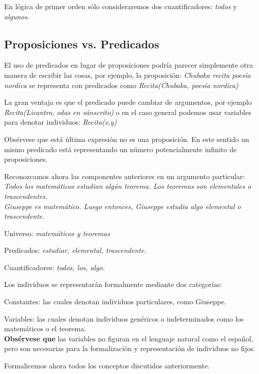 \documentclass[11pt,letterpaper]{article}
\begin{document}
En lógica de primer orden sólo consideraremos dos cuantificadores:
\emph{todos} y \emph{algunos}. 


\subsection{Proposiciones vs. Predicados}

El uso de predicados en lugar de proposiciones podría parecer simplemente
otra manera de escribir las cosas, por ejemplo, la proposición:
\bc
\textit{Chubaka recita poesía nordica}
\ec
se representa con predicados como
\bc
\textit{Recita(Chubaka, poesía nordica)}
\ec

\noindent La gran ventaja es que el predicado puede cambiar de argumentos, por 
ejemplo
\bc
\textit{Recita(Licantro, odas en sánscrito)} 
\ec
o en el caso general podemos usar variables para denotar individuos:
\bc
\textit{Recita(x,y)}
\ec


Obsérvese que está última expresión no es una proposición. 
En este sentido un mismo predicado está representando un número
potencialmente infinito de proposiciones.


\espc
\noindent
Reconozcamos ahora las componentes anteriores en un argumento particular:
\bc
 \emph{Todos los matemáticos estudian algún teorema.
   Los teoremas son elementales o trascendentes. \\
   Giuseppe es  matemático. Luego entonces, Giuseppe estudia algo 
   elemental o trascendente.}
\ec
    
\bi
 \item Universo: \emph{matemáticos y teoremas}
 \item Predicados: \emph{estudiar, elemental, trascendente.}
 \item Cuantificadores: \emph{todos, los, algo.}
 \item Los individuos se representarán formalmente mediante dos categor\'ias:
  \bi
   \item Constantes: las cuales denotan individuos particulares,
     como Giuseppe.
   \item Variables: las cuales denotan individuos genéricos o
     indeterminados como los matemáticos o el teorema. \\
     \textbf{Obsérvese que} las variables no figuran en el lenguaje natural 
como 
     el español, pero son necesarias para la formalización y representaci\'on 
     de individuos no fijos.
  \ei
\ei


Formalicemos ahora todos los conceptos discutidos anteriormente.
\end{document}
